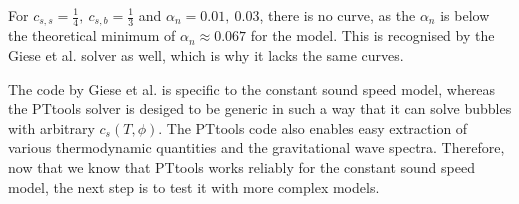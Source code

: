 For $c_{s,s}=\frac{1}{4}, \ c_{s,b}=\frac{1}{3}$ and $\alpha_n = 0.01, \ 0.03$, there is no curve,
as the $\alpha_n$ is below the theoretical minimum of $\alpha_n \approx 0.067$ for the model.
This is recognised by the Giese et al. solver as well,
which is why it lacks the same curves.

The code by Giese et al. is specific to the constant sound speed model,
whereas the PTtools solver is desiged to be generic in such a way that
it can solve bubbles with arbitrary $c_s(T,\phi)$.
The PTtools code also enables easy extraction of various thermodynamic quantities
and the gravitational wave spectra.
Therefore, now that we know that PTtools works reliably for the constant sound speed model,
the next step is to test it with more complex models.
